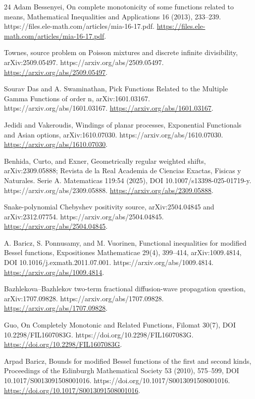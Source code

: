 \documentclass[11pt]{article}
\numberwithin{equation}{section}
\theoremstyle{definition}
\theoremstyle{remark}
\newcommand{\1}{\mathbf 1}
\begin{document}
\begin{thebibliography}{24}
Adam Bessenyei, On complete monotonicity of some functions related to means, Mathematical Inequalities and Applications 16 (2013), 233--239. https://files.ele-math.com/articles/mia-16-17.pdf.
\url{https://files.ele-math.com/articles/mia-16-17.pdf}.

Townes, source problem on Poisson mixtures and discrete infinite divisibility, arXiv:2509.05497. https://arxiv.org/abs/2509.05497.
\url{https://arxiv.org/abs/2509.05497}.

Sourav Das and A. Swaminathan, Pick Functions Related to the Multiple Gamma Functions of order n, arXiv:1601.03167. https://arxiv.org/abs/1601.03167.
\url{https://arxiv.org/abs/1601.03167}.

Jedidi and Vakeroudis, Windings of planar processes, Exponential Functionals and Asian options, arXiv:1610.07030. https://arxiv.org/abs/1610.07030.
\url{https://arxiv.org/abs/1610.07030}.

Benhida, Curto, and Exner, Geometrically regular weighted shifts, arXiv:2309.05888; Revista de la Real Academia de Ciencias Exactas, Fisicas y Naturales. Serie A. Matematicas 119:54 (2025), DOI 10.1007/s13398-025-01719-y. https://arxiv.org/abs/2309.05888.
\url{https://arxiv.org/abs/2309.05888}.

Snake-polynomial Chebyshev positivity source, arXiv:2504.04845 and arXiv:2312.07754. https://arxiv.org/abs/2504.04845.
\url{https://arxiv.org/abs/2504.04845}.

A. Baricz, S. Ponnusamy, and M. Vuorinen, Functional inequalities for modified Bessel functions, Expositiones Mathematicae 29(4), 399--414, arXiv:1009.4814, DOI 10.1016/j.exmath.2011.07.001. https://arxiv.org/abs/1009.4814.
\url{https://arxiv.org/abs/1009.4814}.

Bazhlekova--Bazhlekov two-term fractional diffusion-wave propagation question, arXiv:1707.09828. https://arxiv.org/abs/1707.09828.
\url{https://arxiv.org/abs/1707.09828}.

Guo, On Completely Monotonic and Related Functions, Filomat 30(7), DOI 10.2298/FIL1607083G. https://doi.org/10.2298/FIL1607083G.
\url{https://doi.org/10.2298/FIL1607083G}.

Arpad Baricz, Bounds for modified Bessel functions of the first and second kinds, Proceedings of the Edinburgh Mathematical Society 53 (2010), 575--599, DOI 10.1017/S0013091508001016. https://doi.org/10.1017/S0013091508001016.
\url{https://doi.org/10.1017/S0013091508001016}.


\end{thebibliography}
\end{document}
